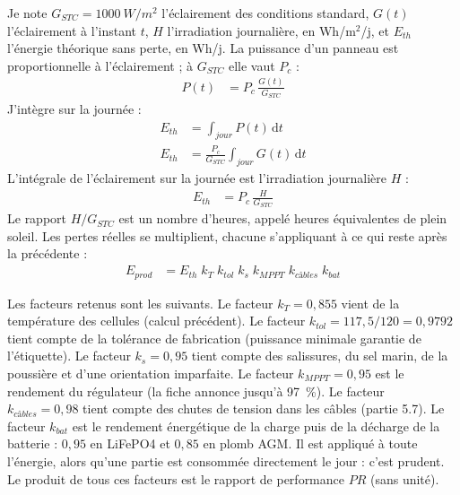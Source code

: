 \begin{demonstration}
Je note $G_{STC} = \qty{1000}{W/m^2}$ l'éclairement des conditions standard, $G(t)$ l'éclairement à l'instant $t$, $H$ l'irradiation journalière, en Wh/m$^2$/j, et $E_{th}$ l'énergie théorique sans perte, en Wh/j. La puissance d'un panneau est proportionnelle à l'éclairement ; à $G_{STC}$ elle vaut $P_c$ :
\begin{align*}
P(t) &= P_c\,\frac{G(t)}{G_{STC}}
\end{align*}
J'intègre sur la journée :
\begin{align*}
E_{th} &= \int_{jour} P(t)\,\mathrm{d}t\\
E_{th} &= \frac{P_c}{G_{STC}} \int_{jour} G(t)\,\mathrm{d}t
\end{align*}
L'intégrale de l'éclairement sur la journée est l'irradiation journalière $H$ :
\begin{align*}
E_{th} &= P_c\,\frac{H}{G_{STC}}
\end{align*}
Le rapport $H/G_{STC}$ est un nombre d'heures, appelé heures équivalentes de plein soleil. Les pertes réelles se multiplient, chacune s'appliquant à ce qui reste après la précédente :
\begin{align*}
E_{prod} &= E_{th}\; k_T\; k_{tol}\; k_s\; k_{MPPT}\; k_{câbles}\; k_{bat}
\end{align*}
\end{demonstration}

Les facteurs retenus sont les suivants. Le facteur $k_T = 0{,}855$ vient de la température des cellules (calcul précédent). Le facteur $k_{tol} = 117{,}5/120 = 0{,}9792$ tient compte de la tolérance de fabrication (puissance minimale garantie de l'étiquette). Le facteur $k_s = 0{,}95$ tient compte des salissures, du sel marin, de la poussière et d'une orientation imparfaite. Le facteur $k_{MPPT} = 0{,}95$ est le rendement du régulateur (la fiche annonce jusqu'à \qty{97}{\percent}). Le facteur $k_{câbles} = 0{,}98$ tient compte des chutes de tension dans les câbles (partie 5.7). Le facteur $k_{bat}$ est le rendement énergétique de la charge puis de la décharge de la batterie : $0{,}95$ en LiFePO4 et $0{,}85$ en plomb AGM. Il est appliqué à toute l'énergie, alors qu'une partie est consommée directement le jour : c'est prudent. Le produit de tous ces facteurs est le rapport de performance $PR$ (sans unité).

